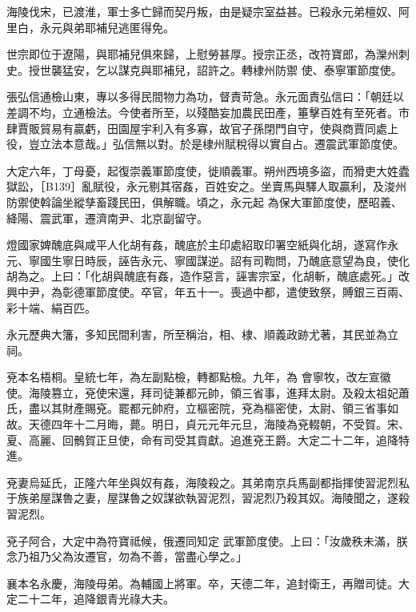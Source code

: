 \begin{pinyinscope}
 海陵伐宋，已渡淮，軍士多亡歸而契丹叛，由是疑宗室益甚。已殺永元弟檀奴、阿里白，永元與弟耶補兒逃匿得免。



 世宗即位于遼陽，與耶補兒俱來歸，上慰勞甚厚。授宗正丞，改符寶郎，為灤州刺史。授世襲猛安，乞以謀克與耶補兒，詔許之。轉棣州防禦
 使、泰寧軍節度使。



 張弘信通檢山東，專以多得民間物力為功，督責苛急。永元面責弘信曰：「朝廷以差調不均，立通檢法。今使者所至，以殘酷妄加農民田產，箠擊百姓有至死者。市肆賈販貿易有贏虧，田園屋宇利入有多寡，故官子孫閉門自守，使與商賈同處上役，豈立法本意哉。」弘信無以對。於是棣州賦稅得以實自占。遷震武軍節度使。



 大定六年，丁母憂，起復崇義軍節度使，徙順義軍。朔州西境多盜，而猾吏大姓蠹獄訟，［B139］亂賦役，永元剔其宿姦，百姓安之。坐賣馬與驛人取贏利，及浚州防禦使斡論坐縱孳畜踐民田，俱解職。頃之，永元起
 為保大軍節度使，歷昭義、絳陽、震武軍，遷濟南尹、北京副留守。



 燈國家婢醜底與咸平人化胡有姦，醜底於主印處紹取印署空紙與化胡，遂寫作永元、寧國生寧日時辰，誣告永元、寧國謀逆。詔有司鞫問，乃醜底意望為良，使化胡為之。上曰：「化胡與醜底有姦，造作惡言，誣害宗室，化胡斬，醜底處死。」改興中尹，為彰德軍節度使。卒官，年五十一。喪過中都，遣使致祭，賻銀三百兩、彩十端、絹百匹。



 永元歷典大籓，多知民間利害，所至稱治，相、棣、順義政跡尤著，其民並為立祠。



 兗本名梧桐。皇統七年，為左副點檢，轉都點檢。九年，為
 會寧牧，改左宣徽使。海陵篡立，兗使宋還，拜司徒兼都元帥，領三省事，進拜太尉。及殺太祖妃蕭氏，盡以其財產賜兗。罷都元帥府，立樞密院，兗為樞密使，太尉、領三省事如故。天德四年十二月晦，薨。明日，貞元元年元旦，海陵為兗輟朝，不受賀。宋、夏、高麗、回鶻賀正旦使，命有司受其貢獻。追進兗王爵。大定二十二年，追降特進。



 兗妻烏延氏，正隆六年坐與奴有姦，海陵殺之。其弟南京兵馬副都指揮使習泥烈私于族弟屋謀魯之妻，屋謀魯之奴謀欲執習泥烈，習泥烈乃殺其奴。海陵聞之，遂殺習泥烈。



 兗子阿合，大定中為符寶祗候，俄遷同知定
 武軍節度使。上曰：「汝歲秩未滿，朕念乃祖乃父為汝遷官，勿為不善，當盡心學之。」



 襄本名永慶，海陵母弟。為輔國上將軍。卒，天德二年，追封衛王，再贈司徒。大定二十二年，追降銀青光祿大夫。




\end{pinyinscope}
